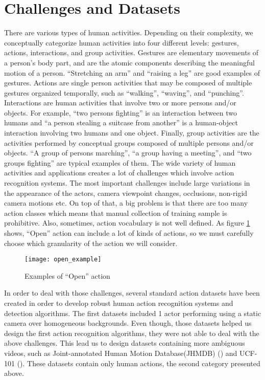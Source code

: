 \section{Challenges and Datasets}
There are various types of human activities. Depending on their complexity, we conceptually categorize human activities into four different
levels: gestures, actions, interactions, and group activities. Gestures are elementary movements of a person’s body part, and are the atomic
components describing the meaningful motion of a person. ``Stretching an arm'' and ``raising a leg'' are good examples of gestures.
Actions are single person activities that may be composed of multiple gestures organized temporally, such as ``walking'', ``waving'', and
``punching''. Interactions are human activities that involve two or more persons and/or objects. For example, ``two persons fighting'' is
an interaction between two humans and ``a person stealing a suitcase from another'' is a human-object interaction involving two humans and one
object. Finally, group activities are the activities performed by conceptual groups composed of multiple persons and/or objects. ``A group of persons marching'', ``a group having a meeting'', and ``two groups fighting'' are typical examples of them.
The wide variety of human activities and applications creates a lot of challenges which involve action recognition systems.
The most important challenges include large variations in the  appearance of the actors, camera viewpoint changes, occlusions,
non-rigid camera motions etc. On top of that, a big problem is that there are too many action classes which means
that manual collection of training sample is prohibitive. Also, sometimes, action vocabulary is not well defined.
As figure \ref{fig:open_example} shows, ``Open'' action can include a lot of kinds of actions, so we must carefully
choose which granularity of the action we will consider.

\begin{figure}[h]
  \centering
  \texttt{[image: open\_example]}
  \caption{Examples of ``Open'' action}
  \label{fig:open_example}

\end{figure}

In order to deal with those challenges, several standard action datasets have been created in order to develop
robust human action recognition systems and detection algorithms.
The first datasets included 1 actor performing using a static camera over homogeneous backgrounds.
Even though, those datasets helped us design the first action recognition algorithms, they were not able to deal with the above
challenges.
This lead us to design datasets containing more ambiguous videos, such as Joint-annotated Human Motion Database(JHMDB) (\cite{Kuehne11})
and UCF-101 (\cite{soomro2012ucf101}). These datasets contain only human actions, the second category presented above.

